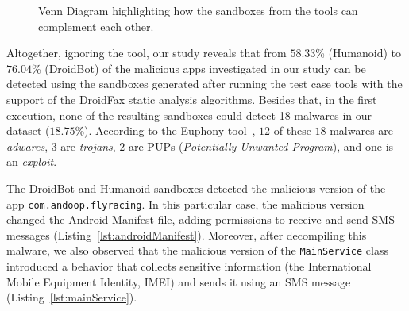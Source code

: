 \begin{figure}[htb]
  \caption{Venn Diagram highlighting how the sandboxes from the tools can
    complement each other.}
  \label{fig:venn-plot1}
\end{figure}


Altogether, ignoring the \joke tool, our study reveals that from $58.33$\% (Humanoid)
to $76.04$\% (DroidBot) of the malicious apps investigated in our study can be
detected using the sandboxes generated after running the test case tools with the support of the
DroidFax static analysis algorithms. Besides that, in the first execution, none of the
resulting sandboxes could detect 18 malwares in our dataset ($18.75$\%). According to
the Euphony tool~\cite{hurier2017euphony}, $12$ of these $18$ malwares are \emph{adwares}, $3$ are \emph{trojans}, $2$ are
PUPs (\emph{Potentially Unwanted Program}), and one is an \emph{exploit}.

The DroidBot and Humanoid sandboxes detected the malicious version of the app
\texttt{com.andoop.flyracing}. In this particular case,
the malicious version changed the Android Manifest file,
adding permissions to receive and send SMS messages
(Listing~\ref{lst:androidManifest}).  Moreover, after decompiling
this malware, we also observed that the malicious version of the
\texttt{MainService} class introduced a
behavior that collects sensitive information (the International Mobile
Equipment Identity, IMEI) and sends it using an SMS message
(Listing~\ref{lst:mainService}). 

